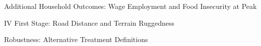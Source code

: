 \clearpage



\clearpage





\clearpage



\clearpage

\begin{table}[H]
\caption{Additional Household Outcomes: Wage Employment and Food Insecurity at Peak}
\label{tab:additional_outcomes}

\end{table}

\clearpage

\begin{table}[H]
\caption{IV First Stage: Road Distance and Terrain Ruggedness}
\label{atab:iv_firststage}

\end{table}

\clearpage



\clearpage



\clearpage

\begin{table}[H]
\caption{Robustness: Alternative Treatment Definitions}
\label{atab:alt_treatment}

\end{table}

\clearpage

